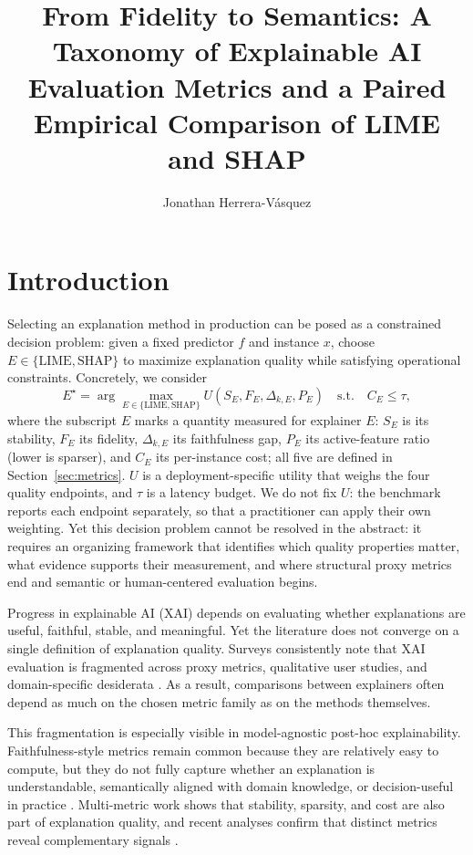 \documentclass[fleqn,10pt,lineno]{wlpeerj}
\title{From Fidelity to Semantics: A Taxonomy of Explainable AI Evaluation
Metrics and a Paired Empirical Comparison of LIME and SHAP}
\author[1]{Jonathan Herrera-V\'asquez}
\affil[1]{Department of Computer Science, Universidad Americana de Europa
(UNADE), Canc\'un, Quintana Roo, Mexico}
\begin{document}
\flushbottom
\maketitle
\thispagestyle{empty}


\section{Introduction}
\label{sec:intro}

Selecting an explanation method in production can be posed as a
constrained decision problem: given a fixed predictor $f$ and instance
$x$, choose $E \in \{\mathrm{LIME}, \mathrm{SHAP}\}$ to maximize
explanation quality while satisfying operational constraints. Concretely,
we consider
\begin{equation}
E^\star = \arg\max_{E \in \{\mathrm{LIME},\mathrm{SHAP}\}}
U(S_E, F_E, \Delta_{k,E}, P_E)
\quad\text{s.t.}\quad C_E \le \tau,
\label{eq:decision}
\end{equation}
where the subscript $E$ marks a quantity measured for explainer $E$:
$S_E$ is its stability, $F_E$ its fidelity, $\Delta_{k,E}$ its
faithfulness gap, $P_E$ its active-feature ratio (lower is sparser), and
$C_E$ its per-instance cost; all five are defined in
Section~\ref{sec:metrics}. $U$ is a deployment-specific utility that
weighs the four quality endpoints, and $\tau$ is a latency budget.
We do not fix $U$: the benchmark reports each endpoint separately, so
that a practitioner can apply their own weighting. Yet this decision
problem cannot be resolved in the abstract: it requires an organizing
framework that identifies which quality properties matter, what evidence
supports their measurement, and where structural proxy metrics end and
semantic or human-centered evaluation begins.

Progress in explainable AI (XAI) depends on evaluating whether
explanations are useful, faithful, stable, and meaningful. Yet the
literature does not converge on a single definition of explanation
quality. Surveys consistently note that XAI evaluation is fragmented
across proxy metrics, qualitative user studies, and domain-specific
desiderata \citep{adadi2018xai,arrieta2020xai,kadir2023metrics,
canha2025benchmark}. As a result, comparisons between explainers often
depend as much on the chosen metric family as on the methods themselves.

\begin{sloppypar}
This fragmentation is especially visible in model-agnostic post-hoc
explainability. Faithfulness-style metrics remain common because they are
relatively easy to compute, but they do not fully capture whether an
explanation is understandable, semantically aligned with domain knowledge,
or decision-useful in practice
\citep{ali2023trustworthy,longo2024manifesto}.
Multi-metric work shows that stability, sparsity, and cost are also
part of explanation quality, and recent analyses confirm that distinct
metrics reveal complementary signals \citep{pawlicki2024metrics,zheng2025ffidelity}.
\end{sloppypar}
\end{document}
